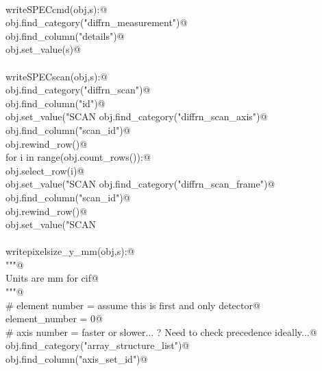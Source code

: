 \documentclass[10pt,a4paper,twoside,notitlepage]{article}
\begin{document}
\begin{flushleft}
\begin{minipage}{\linewidth}
\begin{list}{}{}
\mbox{}\verb@@\\
\mbox{}\verb@def writeSPECcmd(obj,s):@\\
\mbox{}\verb@    obj.find_category("diffrn_measurement")@\\
\mbox{}\verb@    obj.find_column("details")@\\
\mbox{}\verb@    obj.set_value(s)@\\
\mbox{}\verb@@\\
\mbox{}\verb@def writeSPECscan(obj,s):@\\
\mbox{}\verb@    obj.find_category("diffrn_scan")@\\
\mbox{}\verb@    obj.find_column("id")@\\
\mbox{}\verb@    obj.set_value("SCAN%s"%(s))@\\
\mbox{}\verb@    obj.find_category("diffrn_scan_axis")@\\
\mbox{}\verb@    obj.find_column("scan_id")@\\
\mbox{}\verb@    obj.rewind_row()@\\
\mbox{}\verb@    for i in range(obj.count_rows()):@\\
\mbox{}\verb@        obj.select_row(i)@\\
\mbox{}\verb@        obj.set_value("SCAN%s"%(s))@\\
\mbox{}\verb@    obj.find_category("diffrn_scan_frame")@\\
\mbox{}\verb@    obj.find_column("scan_id")@\\
\mbox{}\verb@    obj.rewind_row()@\\
\mbox{}\verb@    obj.set_value("SCAN%s"%(s))@\\
\mbox{}\verb@@\\
\mbox{}\verb@@\\
\mbox{}\verb@def writepixelsize_y_mm(obj,s):@\\
\mbox{}\verb@    """@\\
\mbox{}\verb@    Units are mm for cif@\\
\mbox{}\verb@    """@\\
\mbox{}\verb@    # element number  = assume this is first and only detector@\\
\mbox{}\verb@    element_number = 0@\\
\mbox{}\verb@    # axis number = faster or slower... ? Need to check precedence ideally...@\\
\mbox{}\verb@    obj.find_category("array_structure_list")@\\
\mbox{}\verb@    obj.find_column("axis_set_id")@\\

\end{list}
\end{minipage}
\end{flushleft}
\end{document}
